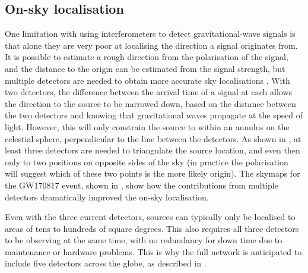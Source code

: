 \subsection{On-sky localisation}
\label{sec:gw_localisation}
\begin{colsection}

One limitation with using interferometers to detect gravitational-wave signals is that alone they are very poor at localising the direction a signal originates from. It is possible to estimate a rough direction from the polarisation of the signal, and the distance to the origin can be estimated from the signal strength, but multiple detectors are needed to obtain more accurate sky localisations \citep{GW_localisation, GW_localisation2}. With two detectors, the difference between the arrival time of a signal at each allows the direction to the source to be narrowed down, based on the distance between the two detectors and knowing that gravitational waves propagate at the speed of light. However, this will only constrain the source to within an annulus on the celestial sphere, perpendicular to the line between the detectors. As shown in , at least three detectors are needed to triangulate the source location, and even then only to two positions on opposite sides of the sky (in practice the polarisation will suggest which of these two points is the more likely origin). The skymaps for the GW170817 event, shown in , show how the contributions from multiple detectors dramatically improved the on-sky localisation.

Even with the three current detectors, sources can typically only be localised to areas of tens to hundreds of square degrees. This also requires all three detectors to be observing at the same time, with no redundancy for down time due to maintenance or hardware problems. This is why the full network is anticipated to include five detectors across the globe, as described in .


\end{colsection}
